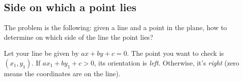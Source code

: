 \subsection{Side on which a point lies}

The problem is the following: given a line and a point in the plane, how to determine on which side of the line the point lies?

Let your line be given by \(ax + by + c = 0\). The point you want to check is \((x_1,y_1)\). If \(ax_1 + by_1 + c > 0\), its orientation is \textit{left}. Otherwise, it's \textit{right} (zero means the coordinates are on the line).
